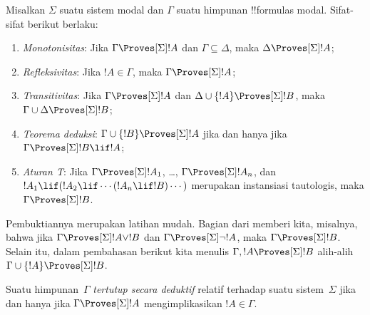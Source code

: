 \documentclass[../../../include/open-logic-section]{subfiles}
\begin{document}


\begin{prop}
  Misalkan $\Sigma$ suatu sistem modal dan $\Gamma$ suatu himpunan
  !!{formula}s modal. Sifat-sifat berikut berlaku:
  \begin{enumerate}
  \item{} \emph{Monotonisitas}:
    Jika $\Gamma\Proves[\Sigma]!A$ dan $\Gamma\subseteq\Delta$, maka
    $\Delta\Proves[\Sigma]!A$;
  \item{}
    \emph{Refleksivitas}: Jika $!A\in\Gamma$, maka
    $\Gamma\Proves[\Sigma]!A$;
  \item{} \emph{Transitivitas}: Jika
    $\Gamma\Proves[\Sigma]!A$ dan
    $\Delta\cup\{!A\}\Proves[\Sigma]!B$, maka
    $\Gamma\cup\Delta\Proves[\Sigma]!B$;
  \item{} \emph{Teorema deduksi}:
    $\Gamma\cup\{!B\}\Proves[\Sigma]!A$ jika dan hanya jika
    $\Gamma\Proves[\Sigma]!B\lif !A$;
  \item{} \emph{Aturan T}: Jika
    $\Gamma\Proves[\Sigma]!A_1$, \dots, $\Gamma\Proves[\Sigma]!A_n$, dan
    $!A_1\lif(!A_2\lif\cdots(!A_n\lif !B)\cdots)$ merupakan instansiasi
    tautologis, maka $\Gamma\Proves[\Sigma]!B$.
  \end{enumerate}
\end{prop}

Pembuktiannya merupakan latihan mudah. Bagian
 dari 
memberi kita, misalnya, bahwa jika $\Gamma\Proves[\Sigma]!A\lor !B$ dan
$\Gamma\Proves[\Sigma]\lnot !A$, maka $\Gamma\Proves[\Sigma]!B$.
Selain itu, dalam pembahasan berikut kita menulis
$\Gamma,!A\Proves[\Sigma]!B$ alih-alih
$\Gamma\cup\{!A\}\Proves[\Sigma]!B$.

\begin{defn}
  Suatu himpunan~$\Gamma$ \emph{tertutup secara deduktif} relatif terhadap
  suatu sistem~$\Sigma$ jika dan hanya jika $\Gamma\Proves[\Sigma]!A$
  mengimplikasikan $!A\in\Gamma$.
\end{defn}
\end{document}
